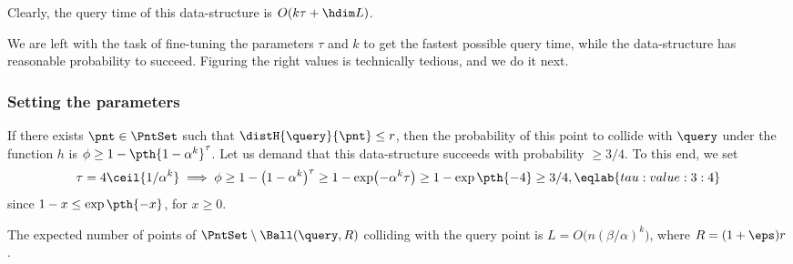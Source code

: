 Clearly, the query time of this data-structure is $O(k \tau + \hdim
L)$.

We are left with the task of fine-tuning the parameters $\tau$ and $k$
to get the fastest possible query time, while the data-structure has
reasonable probability to succeed. Figuring the right values is
technically tedious, and we do it next.


\subsubsection{Setting the parameters}


If there exists $\pnt \in \PntSet$ such that $\distH{\query}{\pnt}
\leq r$, then the probability of this point to collide with $\query$
under the function $h$ is $\phi \geq 1-\pth{1-\alpha^k}^\tau$. Let us
demand that this data-structure succeeds with probability $\geq
3/4$. To this end, we set
\begin{equation}
    \tau%
    =%
    4 \ceil{1/\alpha^k} \implies \phi %
    \geq %
    1-\bigl({1-\alpha^k}\bigr)^\tau%
    \geq
    1-\exp\bigl(-\alpha^k\tau \bigr) %
    \geq%
    1 - \exp\pth{-4} \geq 3/4,
    \eqlab{tau:value:3:4}
\end{equation}
since $1-x \leq \exp\pth{-x}$, for $x \geq 0$.



\begin{lemma}
    The expected number of points of
    $\PntSet \setminus \Ball(\query, R)$ colliding with the query
    point is $L = O\bigl( n (\beta/\alpha)^k \bigr)$, where
    $R = (1+\eps)r$.
\end{lemma}

